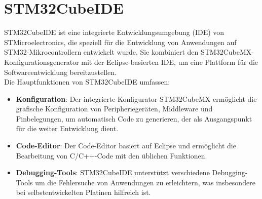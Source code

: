 \section{STM32CubeIDE}
\label{sec:stm32cubeide}
STM32CubeIDE ist eine integrierte Entwicklungsumgebung (IDE) von STMicroelectronics, die speziell für die Entwicklung von Anwendungen auf STM32-Mikrocontrollern entwickelt wurde. Sie kombiniert den STM32CubeMX-Konfigurationsgenerator mit der Eclipse-basierten IDE, um eine Plattform für die Softwareentwicklung bereitzustellen.
\\ 
Die Hauptfunktionen von STM32CubeIDE umfassen:
\begin{itemize}
    \item \textbf{Konfiguration}: Der integrierte Konfigurator STM32CubeMX ermöglicht die grafische Konfiguration von Peripheriegeräten, Middleware und Pinbelegungen, um automatisch Code zu generieren, der als Ausgangspunkt für die weiter Entwicklung dient.
    \item \textbf{Code-Editor}: Der Code-Editor basiert auf Eclipse und ermöglicht die Bearbeitung von C/C++-Code mit den üblichen Funktionen.
    \item \textbf{Debugging-Tools}: STM32CubeIDE unterstützt verschiedene Debugging-Tools um die Fehlersuche von Anwendungen zu erleichtern, was insbesondere bei selbstentwickelten Platinen hilfreich ist.
\end{itemize}

